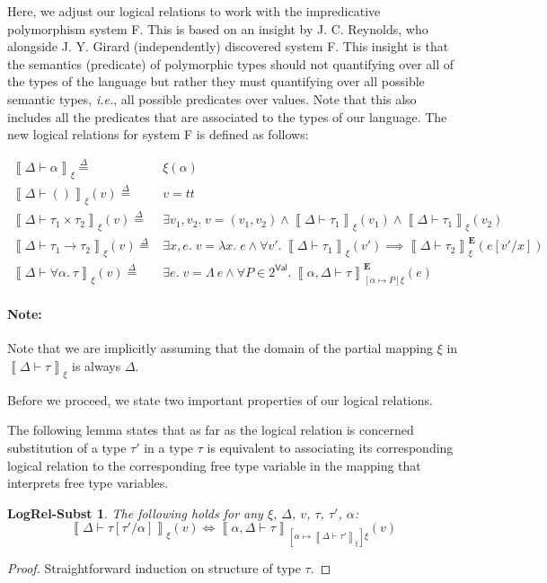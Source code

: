 \documentclass{article}
\newcommand{\ie}{\textit{i.e.}}
\newcommand{\TT}{\mathit{tt}}
\newcommand{\VAL}{\mathsf{Val}}
\newcommand{\UNT}{()}
\newcommand{\defeq}{\overset{\Delta}{=}}
\newcommand{\pred}{P}
\newcommand{\semtyp}[3]{\left\llbracket #2 \vdash #3 \right\rrbracket_{#1}}
\newcommand{\semErel}[1]{#1^{\textbf{E}}}
\newcommand{\semenv}{\xi}
\newcommand{\TLam}{\Lambda}
\newcommand{\CtxTps}{\Delta}
\newcommand{\expr}{e}
\newcommand{\val}{v}
\newcommand{\var}{x}
\newcommand{\typ}{\tau}
\newcommand{\tvar}{\alpha}
\begin{document}
Here, we adjust our logical relations to work with the impredicative polymorphism system F.
This is based on an insight by J. C. Reynolds, who alongside J. Y. Girard (independently) discovered system F.
This insight is that the semantics (predicate) of polymorphic types should not quantifying over all of the types of the language but rather
they must quantifying over all possible semantic types, \ie{}, all possible predicates over values.
Note that this also includes all the predicates that are associated to the types of our language.
The new logical relations for system F is defined as follows:

\begin{align*}
\semtyp{\semenv}{\CtxTps}{\tvar} \defeq{}& \semenv(\tvar)\\
\semtyp{\semenv}{\CtxTps}{\UNT}(\val) \defeq{}& v = \TT\\
\semtyp{\semenv}{\CtxTps}{\typ_1 \times \typ_2}(\val) \defeq{}& \exists \val_1, \val_2.\; \val = (\val_1, \val_2) \land
\semtyp{\semenv}{\CtxTps}{\typ_1}(\val_1) \land \semtyp{\semenv}{\CtxTps}{\typ_1}(\val_2)\\
\semtyp{\semenv}{\CtxTps}{\typ_1 \to \typ_2}(\val) \defeq{}& \exists \var, \expr.\; \val = \lambda \var.\; \expr \land
\forall \val'.~\semtyp{\semenv}{\CtxTps}{\typ_1}(\val') \implies \semErel{\semtyp{\semenv}{\CtxTps}{\typ_2}}(\expr[\val'/\var])\\
\semtyp{\semenv}{\CtxTps}{\forall \tvar.~\typ}(\val) \defeq{}& \exists \expr.\; \val = \TLam~\expr\land
\forall \pred \in 2^{\VAL}.~\semErel{\semtyp{[\tvar \mapsto \pred]\semenv}{\tvar, \CtxTps}{\typ}}(\expr)
\end{align*}

\paragraph{Note:} Note that we are implicitly assuming that the domain of the partial mapping $\semenv$ in $\semtyp{\semenv}{\CtxTps}{\typ}$ is always $\CtxTps$.

Before we proceed, we state two important properties of our logical relations.

The following lemma states that as far as the logical relation is concerned substitution of a type $\typ'$ in a type $\typ$ is equivalent to associating its corresponding logical relation to the corresponding free type variable in the mapping that interprets free type variables.
\newtheorem*{logrelsubst}{LogRel-Subst}
\begin{logrelsubst}
  \makeatletter{}\makeatother
  \label{lem:logrelsubst}
  The following holds for any $\semenv$, $\CtxTps$, $\val$, $\typ$, $\typ'$, $\tvar$:
  \[ \semtyp{\semenv}{\CtxTps}{\typ[\typ'/\tvar]}(\val) \iff \semtyp{[\tvar \mapsto \semtyp{\semenv}{\CtxTps}{\typ'}]\semenv}{\tvar, \CtxTps}{\typ}(\val) \]
\end{logrelsubst}
\begin{proof}
Straightforward induction on structure of type $\typ$.
\end{proof}
\end{document}
